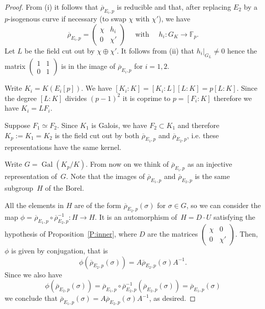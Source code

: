 \documentclass[12pt]{amsart}
\newcommand{\F}{\mathbb{F}}
\newcommand{\rhobar}{{\overline{\rho}}}
\DeclareMathOperator{\Gal}{Gal}
\numberwithin{equation}{section}
\theoremstyle{definition}
\theoremstyle{remark}
\begin{document}
\begin{proof} From (i) it follows that $\rhobar_{E_i,p}$ is reducible and that, after replacing $E_2$ by a $p$-isogenous curve if necessary (to swap 
$\chi$ with $\chi'$), 
we have 
\[
\rhobar_{E_i,p} =  \begin{pmatrix}
                            \chi & h_i \\
                            0 & \chi'
                            \end{pmatrix} \quad \text{ with } \quad  h_i : G_K \to \F_p.  
\]
Let $L$ be the field cut out 
by $\chi \oplus \chi'$. 
It follows from (ii) that $h_i|_{G_L} \neq 0$ 
hence the matrix $\left(\begin{smallmatrix}
                            1 & 1 \\
                            0 & 1
                            \end{smallmatrix} \right)$  
is in the image of $\rhobar_{E_i,p}$ for $i=1,2$.
                            
Write $K_i = K(E_i[p])$. 
We have $[K_i : K] = [K_i : L][L : K] = p [L : K]$. 
Since the degree $[L : K]$ divides $(p-1)^2$ it is coprime 
to $p = [F_i : K]$ therefore we have $K_i = L F_i$.

Suppose $F_1 \simeq F_2$. Since $K_1$ is Galois, we have $F_2 \subset K_1$ and therefore $K_p := K_1 = K_2$ is the field cut out by both
$\rhobar_{E_1,p}$ and $\rhobar_{E_2,p}$, i.e. these representations have the same kernel.

Write $G = \Gal(K_p / K)$. From now on we think of $\rhobar_{E_i,p}$ as an injective representation of~$G$. Note that the images of $\rhobar_{E_1,p}$ and $\rhobar_{E_2,p}$
is the same subgroup~$H$ of the Borel.

All the elements in $H$ are of the form $\rhobar_{E_2,p}(\sigma)$ for $\sigma \in G$, so we can consider the map $\phi = \rhobar_{E_1,p} \circ \rhobar_{E_2,p}^{-1} : H \to H$. It is an automorphism of~$H = D\cdot U$ satisfying the hypothesis of Proposition~\ref{P:inner}, where $D$ are 
the matrices $\left(\begin{smallmatrix}
                            \chi & 0 \\
                            0 & \chi'
                            \end{smallmatrix} \right)$.  
Then, $\phi$ is given by conjugation, that is
\[
 \phi(\rhobar_{E_2,p}(\sigma)) = A \rhobar_{E_2,p}(\sigma) A^{-1}.
\]
Since we also have
\[ 
\phi(\rhobar_{E_2,p}(\sigma)) 
=  \rhobar_{E_1,p} \circ \rhobar_{E_2,p}^{-1}(\rhobar_{E_2,p}(\sigma)) = \rhobar_{E_1,p}(\sigma)
\]
we conclude that $\rhobar_{E_1,p}(\sigma) = A \rhobar_{E_2,p}(\sigma) A^{-1}$, as desired.
\end{proof}
\end{document}
